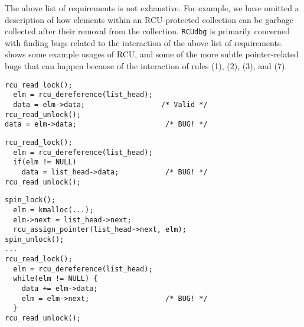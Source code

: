 \documentclass[preprint]{sigplanconf}
\begin{document}
The above list of requirements is not exhaustive. For example, we have omitted a description of how elements within an RCU-protected collection can be garbage collected after their removal from the collection. \texttt{RCUdbg} is primarily concerned with finding bugs related to the interaction of the above list of requirements.  shows some example usages of RCU, and some of the more subtle pointer-related bugs that can happen because of the interaction of rules (1), (2), (3), and (7).

%


\newsavebox\rcuexistencebug
\begin{lrbox}{\rcuexistencebug}
\begin{lstlisting}[basicstyle=\footnotesize\ttfamily]
rcu_read_lock();
  elm = rcu_dereference(list_head);
  data = elm->data;                  /* Valid */
rcu_read_unlock();
data = elm->data;                     /* BUG! */
\end{lstlisting}
\end{lrbox}

\newsavebox\rcuderefbug
\begin{lrbox}{\rcuderefbug}
\begin{lstlisting}[basicstyle=\footnotesize\ttfamily]
rcu_read_lock();
  elm = rcu_dereference(list_head);
  if(elm != NULL)
    data = list_head->data;           /* BUG! */
rcu_read_unlock();
\end{lstlisting}
\end{lrbox}

\newsavebox\rcuassignderefbug
\begin{lrbox}{\rcuassignderefbug}
\begin{lstlisting}[basicstyle=\footnotesize\ttfamily]
spin_lock();
  elm = kmalloc(...);
  elm->next = list_head->next;
  rcu_assign_pointer(list_head->next, elm);
spin_unlock();
...
rcu_read_lock();
  elm = rcu_dereference(list_head);
  while(elm != NULL) {
    data += elm->data;
    elm = elm->next;                  /* BUG! */
  }
rcu_read_unlock();
\end{lstlisting}
\end{lrbox}
\end{document}
